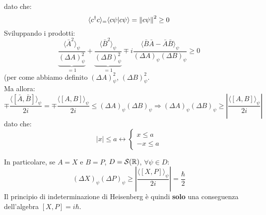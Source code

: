 \documentclass[../../FisicaTeorica.tex]{subfiles}
\begin{document}
dato che:
\[
\langle c^\dag c\rangle_= \langle c\psi | c\psi \rangle =\left\lVert c\psi\right\rVert^2 \geq 0
\]
Sviluppando i prodotti:
\[
\underbrace{\frac{\langle \bar{A}^2 \rangle_\psi}{(\Delta A)^2_\psi}}_{=1} +
\underbrace{\frac{\langle \bar{B}^2\rangle_\psi}{(\Delta B)^2_\psi}}_{=1} \mp i \frac{\langle \bar{B}\bar{A}-\bar{A}\bar{B}\rangle_\psi}{(\Delta A)_\psi (\Delta B)_\psi}\geq 0
\]
(per come abbiamo definito $(\Delta A)^2_\psi$, $(\Delta B)^2_\psi$.\\
Ma allora:
\[
\mp \frac{\langle [\bar{A},\bar{B}]\rangle_\psi}{2i} = \mp \frac{\langle [A,B]\rangle_\psi}{2i}\leq (\Delta A)_\psi (\Delta B)_\psi \Rightarrow (\Delta A)_\psi (\Delta B)_\psi \geq \left |\frac{\langle [A,B]\rangle_\psi}{2i} \right |
\]
dato che:
\[
|x|\leq a \leftrightarrow \begin{cases}
x \leq a\\
-x \leq a
\end{cases}
\]

In particolare, se $A=X$ e $B=P$, $D=\mathcal{S}(\mathbb{R})$, $\forall \psi \in D$:
\[
(\Delta X)_\psi (\Delta P)_\psi \geq \left | 
\frac{\langle [X,P]\rangle_\psi}{2i}
\right | = \frac{\hbar}{2}
\]
Il principio di indeterminazione di Heisenberg è quindi \textbf{solo} una conseguenza dell'algebra $[X,P]=i\hbar$.\\
\end{document}
